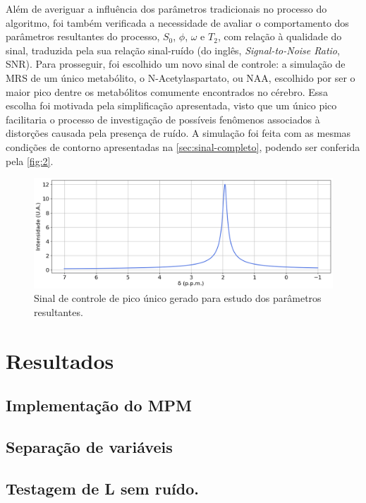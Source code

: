 \documentclass[12pt]{article}
\begin{document}
Além de averiguar a influência dos parâmetros tradicionais no processo do algoritmo, foi também verificada a necessidade de avaliar o 
comportamento dos parâmetros resultantes do processo, $S_0$, $\phi$, $\omega$ e $T_2$, com relação à qualidade do sinal, traduzida pela
sua relação sinal-ruído (do inglês, \textit{Signal-to-Noise Ratio}, SNR). Para prosseguir, foi escolhido um novo sinal de controle: a 
simulação de MRS de um único metabólito, o N-Acetylaspartato, ou NAA, escolhido por ser o maior pico dentre os metabólitos comumente 
encontrados no cérebro. Essa escolha foi motivada pela simplificação apresentada, visto que um único pico facilitaria o processo de 
investigação de possíveis fenômenos associados à distorções causada pela presença de ruído. A simulação foi feita com as mesmas 
condições de contorno apresentadas na \autoref{sec:sinal-completo}, podendo ser conferida pela
\autoref{fig:2}.

\begin{figure} [H]
    \includegraphics[scale=0.5]{sinal-unico-pico.png}
    \centering
    \caption{Sinal de controle de pico único gerado para estudo dos parâmetros resultantes.}
    \label{fig:2}
\end{figure}

\section{Resultados}

\subsection{Implementação do MPM}

\subsection{Separação de variáveis}

\subsection{Testagem de L sem ruído.}
\end{document}
